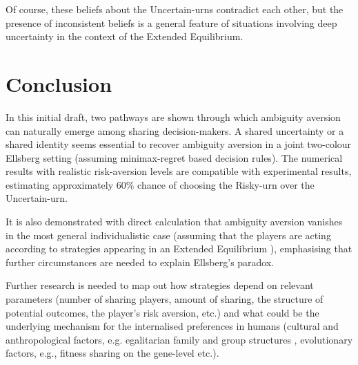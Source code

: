 \documentclass{article}
\theoremstyle{definition}
\begin{document}
Of course, these beliefs about the Uncertain-urns contradict each other, but the presence of inconsistent beliefs is a general feature of situations involving deep uncertainty in the context of the Extended Equilibrium.

\section{Conclusion}

In this initial draft, two pathways are shown through which ambiguity aversion can naturally emerge among sharing decision-makers.
A shared uncertainty or a shared identity seems essential to recover ambiguity aversion in a joint two-colour Ellsberg setting (assuming minimax-regret based decision rules).
The numerical results with realistic risk-aversion levels are compatible with experimental results, estimating approximately 60\% chance of choosing the Risky-urn over the Uncertain-urn.

It is also demonstrated with direct calculation that ambiguity aversion vanishes in the most general individualistic case (assuming that the players are acting according to strategies appearing in an Extended Equilibrium \cite{arxiv:ExtendedEquilibrium}), emphasising that further circumstances are needed to explain Ellsberg's paradox.

Further research is needed to map out how strategies depend on relevant parameters (number of sharing players, amount of sharing, the structure of potential outcomes, the player's risk aversion, etc.) and what could be the underlying mechanism for the internalised preferences in humans (cultural and anthropological factors, e.g. egalitarian family and group structures \cite{book:Graeber}, evolutionary factors, e.g., fitness sharing on the gene-level \cite{book:SelfishGene} etc.).

\newpage

%

%

\printbibliography

%

%

\end{document}

